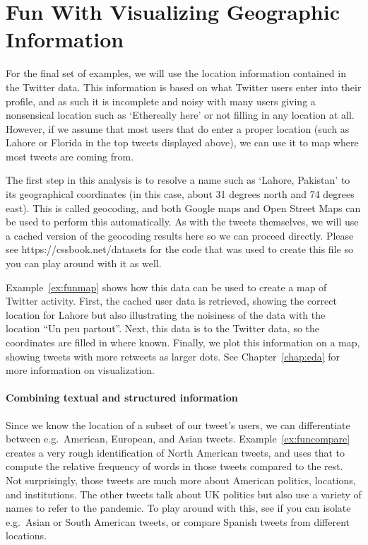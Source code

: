 
\section{Fun With Visualizing Geographic Information}\label{sec:fungeo}
For the final set of examples, we will use the location information contained in the Twitter data.
This information is based on what Twitter users enter into their profile, and as such it is incomplete and noisy
with many users giving a nonsensical location such as `Ethereally here' or not filling in any location at all.
However, if we assume that most users that do enter a proper location (such as Lahore or Florida in the top tweets displayed above),
we can use it to map where most tweets are coming from.

The first step in this analysis is to resolve a name such as `Lahore, Pakistan' to its geographical coordinates (in this case, about 31 degrees north and 74 degrees east). This is called geocoding, and both Google maps and Open Street Maps can be used
to perform this automatically.
As with the tweets themselves, we will use a cached version of the geocoding results here so we can proceed directly.
Please see https://cssbook.net/datasets for the code that was used to create this file so you can play around with it as well. 

Example~\ref{ex:funmap} shows how this data can be used to create a map of Twitter activity.
First, the cached user data is retrieved, showing the correct location for Lahore but also
illustrating the noisiness of the data with the location ``Un peu partout''.
Next, this data is  to the Twitter data, so the coordinates are filled in where known.
Finally, we plot this information on a map, showing tweets with more retweets as larger dots.
See Chapter~\ref{chap:eda} for more information on visualization.



\paragraph{Combining textual and structured information}
Since we know the location of a subset of our tweet's users,
we can differentiate between e.g.\ American, European, and Asian tweets.
Example~\ref{ex:funcompare} creates a very rough identification of North American tweets,
and uses that to compute the relative frequency of words in those tweets compared to the rest.
Not surprisingly, those tweets are much more about American politics, locations, and institutions.
The other tweets talk about UK politics but also use a variety of names to refer to the pandemic.
To play around with this, see if you can isolate e.g.\ Asian or South American tweets,
or compare Spanish tweets from different locations.

